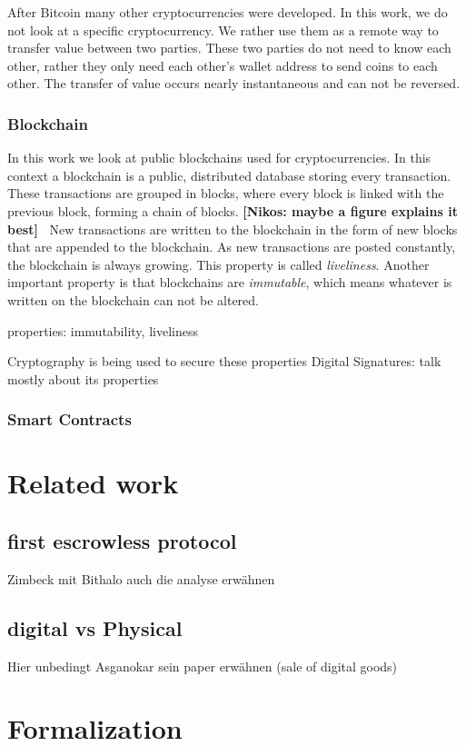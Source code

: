 \documentclass{cacthesis}
\newcommand{\authnote}[3]{{ \footnotesize \textbf{#1[#2: #3]~}}}
\newcommand{\niknote}[1]{\authnote{\color{red}}{Nikos}{#1}}
\begin{document}
After Bitcoin many other cryptocurrencies were developed. In this work, we do not look at a specific cryptocurrency. We rather use them as a remote way to transfer value between two parties. These two parties do not need to know each other, rather they only need each other's wallet address to send coins to each other. The transfer of value occurs nearly instantaneous and can not be reversed.
\subsection{Blockchain}
\label{sec:blockchain}
In this work we look at public blockchains used for cryptocurrencies. In this context a blockchain is a public, distributed database storing every transaction. These transactions are grouped in blocks, where every block is linked with the previous block, forming a chain of blocks. \niknote{maybe a figure explains it best}   New transactions are written to the blockchain in the form of new blocks that are appended to the blockchain. As new transactions are posted constantly, the blockchain is always growing. This property is called \emph{liveliness}. Another important property is that blockchains are \emph{immutable}, which means whatever is written on the blockchain can not be altered.

properties: immutability, liveliness 

Cryptography is being used to secure these properties
Digital Signatures:\cite{Katz2020-aj} 
talk mostly about its properties
\subsection{Smart Contracts}

\chapter{Related work}
\section{first escrowless protocol}
Zimbeck mit Bithalo
auch die analyse erwähnen
\section{digital vs Physical}
Hier unbedingt Asganokar sein paper erwähnen (sale of digital goods)

\chapter{Formalization}
\end{document}
